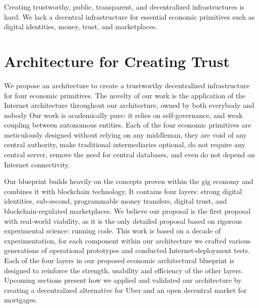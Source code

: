 \documentclass[USenglish]{article}
\begin{document}
Creating trustworthy, public, transparent, and decentralized infrastructures is hard.
We lack a decentral infrastructure for essential economic primitives such as digital identities, money, trust, and marketplaces. 

\section{Architecture for Creating Trust}

We propose an architecture to create a trustworthy decentralized infrastructure for four economic primitives.
The novelty of our work is the application of the Internet architecture throughout our architecture, owned by both everybody and nobody
Our work is academically pure: it relies on self-governance, and weak coupling between autonomous entities. 
Each of the four economic primitives are meticulously designed without relying on any middleman, they are void of any central authority, make traditional intermediaries optional, do not require any central server, remove the need for central databases, and even do not depend on Internet connectivity.

Our blueprint builds heavily on the concepts proven within the gig economy and combines it with blockchain technology.
It contains four layers: strong digital identities, sub-second, programmable money transfers, digital trust, and blockchain-regulated marketplaces.
We believe our proposal is the first proposal with real-world viability, as it is the only detailed proposal based on rigorous experimental science: running code.
This work is based on a decade of experimentation, for each component within our architecture we crafted various generations of operational prototypes and conducted Internet-deployment tests.
Each of the four layers in our proposed economic architectural blueprint is designed to reinforce the strength, usability and efficiency of the other layers. 
Upcoming sections present how we applied and validated our architecture by creating a decentralized alternative for Uber and an open decentral market for mortgages.
\end{document}
